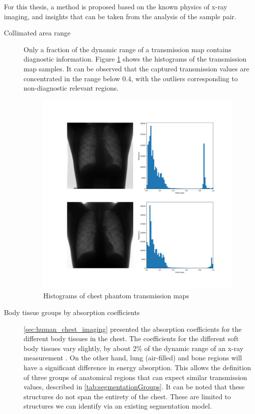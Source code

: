 \documentclass[nomenclature, english, bibtex]{kththesis}
\numberwithin{listing}{chapter}
\begin{document}
For this thesis, a method is proposed based on the known physics of x-ray imaging, and insights that can be
taken from the analysis of the sample pair.
\begin{description}
    \item[Collimated area range] Only a fraction of the dynamic range of a transmission map
   contains diagnostic information. Figure \ref{fig:transmissionMapsHistograms} shows the histograms
   of the transmission map samples. It can be observed that the captured transmission values are concentrated in
  the range below 0.4, with the outliers corresponding to non-diagnostic relevant regions.
  \begin{figure}[H]
        \centering
        \includegraphics[width=1.0\textwidth]{figures/transmission_maps_histograms.png}
        \caption{Histograms of chest phantom transmission maps}
        \label{fig:transmissionMapsHistograms}
    \end{figure}

    \item[Body tissue groups by absorption coefficients] \autoref{sec:human_chest_imaging} presented the absorption coefficients
    for the different body tissues in the chest. The coefficients for the different soft body tissues
    vary slightly, by about 2\% of the dynamic range of an x-ray measurement \cite[p.~54]{epstein2008}. On the other hand,
    lung (air-filled) and bone regions will have a significant difference in energy absorption. This allows the
    definition of three groups of anatomical regions that can expect similar transmission values, described in
    \autoref{tab:segmentationGroups}. It can be noted that these structures do not span the entirety of the
   chest. These are limited to structures we can identify via an existing segmentation model.


\end{description}
\end{document}
